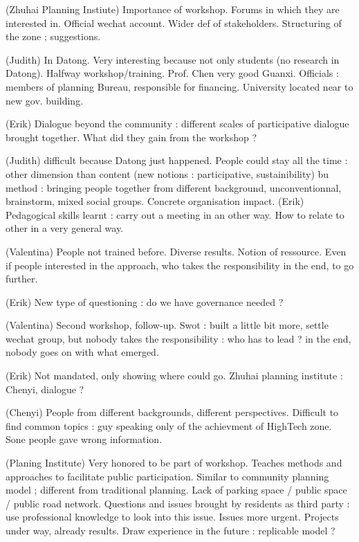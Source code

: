 \documentclass[11pt]{article}
\begin{document}
(Zhuhai Planning Instiute) Importance of workshop. Forums in which they are interested in. Official wechat account. Wider def of stakeholders. Structuring of the zone ; suggestions.

(Judith) In Datong. Very interesting because not only students (no research in Datong). Halfway workshop/training. Prof. Chen very good Guanxi. Officials : members of planning Bureau, responsible for financing. University located near to new gov. building. 

(Erik) Dialogue beyond the community : different scales of participative dialogue brought together. What did they gain from the workshop ?

(Judith) difficult because Datong just happened. People could stay all the time : other dimension than content (new notions : participative, sustainibility) bu method : bringing people together from different background, unconventionnal, brainstorm, mixed social groups. Concrete organisation impact. (Erik) Pedagogical skills learnt : carry out a meeting in an other way. How to relate to other in a very general way.

(Valentina) People not trained before. Diverse results. Notion of ressource. Even if people interested in the approach, who takes the responsibility in the end, to go further.

(Erik) New type of questioning : do we have governance needed ?

(Valentina) Second workshop, follow-up. Swot : built a little bit more, settle wechat group, but nobody takes the responsibility : who has to lead ? in the end, nobody goes on with what emerged. 

(Erik) Not mandated, only showing where could go. Zhuhai planning institute : Chenyi, dialogue ?

(Chenyi) People from different backgrounds, different perspectives. Difficult to find common topics : guy speaking only of the achievment of HighTech zone. Sone people gave wrong information.

(Planing Institute) Very honored to be part of workshop. Teaches methods and approaches to facilitate public participation. Similar to community planning model ; different from traditional planning. Lack of parking space / public space / public road network. Questions and issues brought by residents as third party : use professional knowledge to look into this issue. Issues more urgent. Projects under way, already results. Draw experience in the future : replicable model ?
\end{document}
